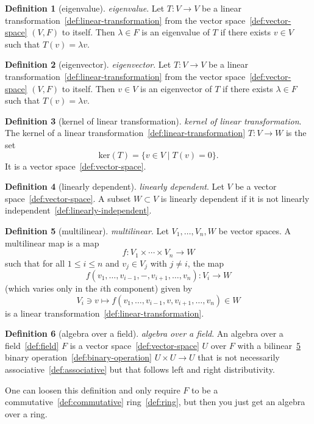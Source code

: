 \documentclass[12pt,a4paper]{article}
\theoremstyle{definition}
\newtheorem{definition}{Definition}
\begin{document}
\begin{definition}[eigenvalue]\label{def:eigenvalue}
\emph{eigenvalue}. Let $T:V\to V$ be a linear transformation~\ref{def:linear-transformation} from the vector space~\ref{def:vector-space} $(V,F)$ to itself. Then $\lambda \in F$ is an eigenvalue of $T$ if there exists $v\in V$ such that $T(v) = \lambda v$.
\end{definition}

\begin{definition}[eigenvector]\label{def:eigenvector}
\emph{eigenvector}. Let $T:V\to V$ be a linear transformation~\ref{def:linear-transformation} from the vector space~\ref{def:vector-space} $(V,F)$ to itself. Then $v \in V$ is an eigenvector of $T$ if there exists $\lambda\in F$ such that $T(v) = \lambda v$.
\end{definition}

\begin{definition}[kernel of linear transformation]\label{def:kernel-of-linear-transformation}
\emph{kernel of linear transformation}. The kernel of a linear transformation~\ref{def:linear-transformation} $T:V\to W$ is the set $$\text{ker}(T)= \{v\in V\mid T(v) =0\}.$$ It is a vector space~\ref{def:vector-space}.
\end{definition}

\begin{definition}[linearly dependent]\label{def:linearly-dependent}
\emph{linearly dependent}. Let $V$ be a vector space~\ref{def:vector-space}. A subset $W \subset V$ is linearly dependent if it is not linearly independent~\ref{def:linearly-independent}.
\end{definition}

\begin{definition}[multilinear]\label{def:multilinear}
\emph{multilinear}. Let $V_1,\dots,V_n, W$ be vector spaces. A multilinear map is a map $$f: V_1 \times\cdots\times V_n \to W$$ such that for all $1\leq i \leq n$ and $v_j \in V_j$ with $j \neq i$, the map $$f(v_1,\dots, v_{i-1}, -, v_{i+1}, \dots, v_n):V_i \to W$$ (which varies only in the $i$th component) given by $$V_i \ni v \mapsto f(v_1,\dots, v_{i-1}, v, v_{i+1}, \dots, v_n) \in W$$ is a linear transformation~\ref{def:linear-transformation}.
\end{definition}

\begin{definition}[algebra over a field]\label{def:algebra-over-a-field}
\emph{algebra over a field}. An algebra over a field~\ref{def:field} $F$ is a vector space~\ref{def:vector-space} $U$ over $F$ with a bilinear~\ref{def:multilinear} binary operation~\ref{def:binary-operation} $U\times U \to U$ that is not necessarily associative~\ref{def:associative} but that follows left and right distributivity.

One can loosen this definition and only require $F$ to be a commutative~\ref{def:commutative} ring~\ref{def:ring}, but then you just get an algebra over a ring.
\end{definition}
\end{document}
